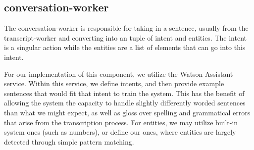 \subsection{conversation-worker}

The conversation-worker is responsible for taking in a sentence, usually from the transcript-worker
and converting into an tuple of intent and entities. The intent is a singular action while the entities
are a list of elements that can go into this intent.

For our implementation of this component, we utilize the Watson Assistant service. Within this service,
we define intents, and then provide example sentences that would fit that intent to train the system.
This has the benefit of allowing the system the capacity to handle slightly differently worded sentences
than what we might expect, as well as gloss over spelling and grammatical errors that arise from the
transcription process. For entities, we may utilize built-in system ones (such as numbers), or define
our ones, where entities are largely detected through simple pattern matching.
